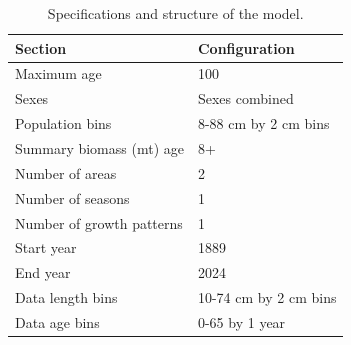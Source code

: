\documentclass[
]{scrartcl}
\begin{document}
\begin{longtable}{ll}

\caption{\label{tbl-model-config}Specifications and structure of the
model.}

\tabularnewline

\toprule
Section & Configuration \\ 
\midrule\addlinespace[2.5pt]
Maximum age & 100 \\ 
Sexes & Sexes combined \\ 
Population bins & 8-88 cm by 2 cm bins \\ 
Summary biomass (mt) age & 8+ \\ 
Number of areas & 2 \\ 
Number of seasons & 1 \\ 
Number of growth patterns & 1 \\ 
Start year & 1889 \\ 
End year & 2024 \\ 
Data length bins & 10-74 cm by 2 cm bins \\ 
Data age bins & 0-65 by 1 year \\ 
\bottomrule

\end{longtable}

\endgroup

\clearpage

\begingroup
\fontsize{9.0pt}{10.8pt}\selectfont
\end{document}
